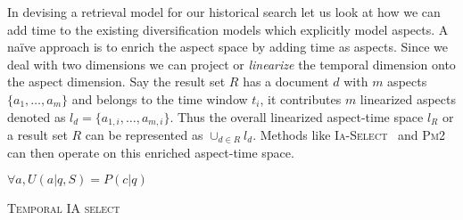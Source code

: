 

In devising a retrieval model for our historical search let us look at how we can add time to the existing diversification models which explicitly model aspects. A na\"ive approach is to enrich the aspect space by adding time as aspects. Since we deal with two dimensions we can project or \emph{linearize} the temporal dimension onto the aspect dimension. Say the result set $R$ has a document $d$ with $m$ aspects $\{ a_1, \ldots, a_m \}$ and belongs to the time window $t_i$, it contributes $m$ linearized aspects denoted as $l_d = \{ a_{1,i}, \ldots, a_{m,i} \}$. Thus the overall linearized aspect-time space $l_R$ or a result set $R$ can be represented as $\cup_{d \in R}{l_d}$. Methods like \textsc{Ia-Select}~\cite{agrawal_diversifying_2009} and \textsc{Pm2}~\cite{dang_diversity_2012} can then operate on this enriched aspect-time space.

\begin{algorithm}[t]
  \small

  \nl $\forall a, U(a|q, S) = P(c|q)$

  \nl{}

  \nl{}

  \BlankLine

  \caption{\textsc{Temporal IA select}}
  \vspace{-2mm}
  \label{alg:tia-sel}
\end{algorithm}


